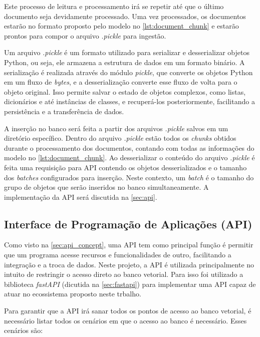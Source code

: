 \documentclass[a4paper, 12pt]{article}
\begin{document}
    Este processo de leitura e processamento irá se repetir até que o último documento seja devidamente processado. Uma vez processados, os documentos estarão no formato proposto pelo modelo no \autoref{lst:document_chunk} e estarão prontos para compor o arquivo \textit{.pickle} para ingestão. 
    
    Um arquivo \textit{.pickle} é um formato utilizado para serializar e desserializar objetos Python, ou seja, ele armazena a estrutura de dados em um formato binário. A serialização é realizada através do módulo \textit{pickle}, que converte os objetos Python em um fluxo de \textit{bytes}, e a desserialização converte esse fluxo de volta para o objeto original. Isso permite salvar o estado de objetos complexos, como listas, dicionários e até instâncias de classes, e recuperá-los posteriormente, facilitando a persistência e a transferência de dados.

    A inserção no banco será feita a partir dos arquivos \textit{.pickle} salvos em um diretório específico. Dentro do arquivo \textit{.pickle} estão todos os \textit{chunks} obtidos durante o processamento dos documentos, contando com todas as informações do modelo no \autoref{lst:document_chunk}. Ao desserializar o conteúdo do arquivo \textit{.pickle} é feita uma requisição para API contendo os objetos desserializados e o tamanho dos \textit{batches} configurados para inserção. Neste contexto, um \textit{batch} é o tamanho do grupo de objetos que serão inseridos no banco simultaneamente. A implementação da API será discutida na \autoref{sec:api}.

    \subsection{Interface de Programação de Aplicações (API)}\label{sec:api}

    Como visto na \autoref{sec:api_concept}, uma API tem como principal função é permitir que um programa acesse recursos e funcionalidades de outro, facilitando a integração e a troca de dados. Neste projeto, a API é utilizada principalmente no intuito de restringir o acesso direto ao banco vetorial. Para isso foi utilizado a biblioteca \textit{fastAPI} (dicutida na \autoref{sec:fastapi}) para implementar uma API capaz de atuar no ecossistema proposto neste trbalho.

    Para garantir que a API irá sanar todos os pontos de acesso ao banco vetorial, é necessário listar todos os cenários em que o acesso ao banco é necessário. Esses cenários são:
\end{document}
